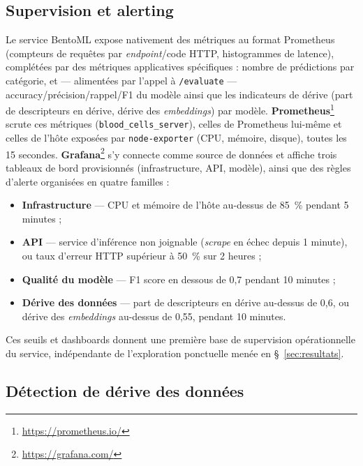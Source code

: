 \subsection{Supervision et alerting}
\label{sub:mlops-monitoring}

Le service BentoML expose nativement des métriques au format Prometheus (compteurs de requêtes par \emph{endpoint}/code HTTP, histogrammes de latence), complétées par des métriques applicatives spécifiques : nombre de prédictions par catégorie, et — alimentées par l'appel à \texttt{/evaluate} — accuracy/précision/rappel/F1 du modèle ainsi que les indicateurs de dérive (part de descripteurs en dérive, dérive des \emph{embeddings}) par modèle.
\textbf{Prometheus}\footnote{\url{https://prometheus.io/}} scrute ces métriques (\texttt{blood\_cells\_server}), celles de Prometheus lui-même et celles de l'hôte exposées par \texttt{node-exporter} (CPU, mémoire, disque), toutes les 15 secondes.
\textbf{Grafana}\footnote{\url{https://grafana.com/}} s'y connecte comme source de données et affiche trois tableaux de bord provisionnés (infrastructure, API, modèle), ainsi que des règles d'alerte organisées en quatre familles :
\begin{itemize}
  \item \textbf{Infrastructure} — CPU et mémoire de l'hôte au-dessus de 85~\% pendant 5 minutes ;
  \item \textbf{API} — service d'inférence non joignable (\emph{scrape} en échec depuis 1 minute), ou taux d'erreur HTTP supérieur à 50~\% sur 2 heures ;
  \item \textbf{Qualité du modèle} — F1 score en dessous de 0,7 pendant 10 minutes ;
  \item \textbf{Dérive des données} — part de descripteurs en dérive au-dessus de 0,6, ou dérive des \emph{embeddings} au-dessus de 0,55, pendant 10 minutes.
\end{itemize}
Ces seuils et dashboards donnent une première base de supervision opérationnelle du service, indépendante de l'exploration ponctuelle menée en \S~\ref{sec:resultats}.

\subsection{Détection de dérive des données}
\label{sub:mlops-drift}

